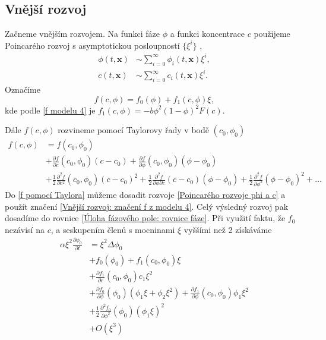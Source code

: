 \subsection{Vnější rozvoj}\label{Sekce: Vnější rozvoj}
Začneme vnějším rozvojem.
Na funkci fáze \(\phi\) a funkci koncentrace \(c\) použijeme Poincarého rozvoj s asymptotickou posloupností \(\{\xi^i\}\) \cite{Lagerstrom_1988},
\begin{subequations}\label{Poincarého rozvoje phi a c}
    \begin{align}
        \phi(t, \mathbf{x}) &\sim \sum_{i=0}^\infty \phi_i(t, \mathbf{x}) \xi^i,\\
        c(t, \mathbf{x}) &\sim \sum_{i=0}^\infty c_i(t, \mathbf{x}) \xi^i.
    \end{align}
\end{subequations}
Označíme
\begin{equation}\label{Vnější rozvoj: značení f z modelu 4}
    f(c, \phi) = f_0(\phi) + f_1(c, \phi) \xi,
\end{equation}
kde podle \eqref{f modelu 4} je \(f_1(c, \phi) = - b \phi^2 (1-\phi)^2 F(c).\)

Dále \(f(c, \phi)\) rozvineme pomocí Taylorovy řady v bodě \( (c_0, \phi_0)\)
\begin{equation}\label{f pomocí Taylora}
    \begin{aligned}
        f(c,\phi) &= f(c_0, \phi_0)\\ &+ \frac{\partial f}{\partial c}(c_0, \phi_0) (c-c_0) + \frac{\partial f}{\partial \phi}(c_0, \phi_0) (\phi-\phi_0)\\
        &+ \frac{1}{2}\frac{\partial^2 f}{\partial c^2}(c_0, \phi_0)(c-c_0)^2 + \frac{1}{2}\frac{\partial^2 f}{\partial \phi\partial c}(c-c_0)(\phi-\phi_0) + \frac{1}{2}\frac{\partial^2f}{\partial \phi^2}(\phi-\phi_0)^2 + \ldots
    \end{aligned}
\end{equation}
Do \eqref{f pomocí Taylora} můžeme dosadit rozvoje \eqref{Poincarého rozvoje phi a c} a použít značení \eqref{Vnější rozvoj: značení f z modelu 4}. Celý výsledný rozvoj pak dosadíme do rovnice \eqref{Úloha fázového pole: rovnice fáze}.
Při využití faktu, že \(f_0\) nezávisí na \(c\), a seskupením členů s mocninami \(\xi\) vyššími než 2 získáváme
\begin{equation}
    \begin{aligned}
        \alpha \xi^2 \frac{\partial \phi_0}{\partial t} &= \xi^2 \Delta \phi_0\\
        &+ f_0(\phi_0) + f_1(c_0, \phi_0)\xi\\
        &+ \frac{\partial f_1}{\partial c}(c_0, \phi_0)c_1 \xi^2 \\
        &+ \frac{\partial f_0}{\partial \phi}(\phi_0) \left(\phi_1 \xi + \phi_2 \xi^2\right) + \frac{\partial f_1}{\partial \phi}(c_0, \phi_0) \phi_1 \xi^2\\
        &+ \frac{1}{2}\frac{\partial^2 f_0}{\partial \phi^2}(\phi_0) \left( \phi_1\xi\right)^2\\
        &+O(\xi^3)
    \end{aligned}
\end{equation}

